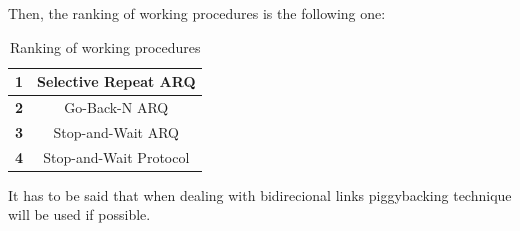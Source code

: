 Then, the ranking of working procedures is the following one: 
\begin{table}[H]
\begin{center}
\begin{tabular}{|c|c|}
\hline
\textbf{1}&Selective Repeat ARQ\\
\hline
\textbf{2}&Go-Back-N ARQ\\
\hline
\textbf{3}&Stop-and-Wait ARQ\\
\hline
\textbf{4}&Stop-and-Wait Protocol\\
\hline
\end{tabular}
\caption{Ranking of working procedures}
\end{center}
\end{table}
It has to be said that when dealing with bidirecional links piggybacking technique will be used if possible.
